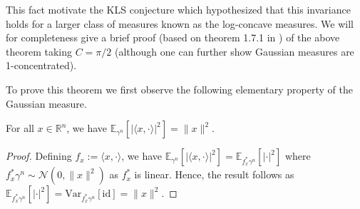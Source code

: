 This fact motivate the KLS conjecture which hypothesized that 
this invariance holds for a larger class of measures known as the log-concave measures. We will 
for completeness give a brief proof (based on theorem 1.7.1 in \cite{Bogachev_1998}) of the above theorem taking \(C = \pi / 2\) 
(although one can further show Gaussian measures are 1-concentrated).

To prove this theorem we first observe the following elementary property of the Gaussian measure.

\begin{lemma}\label{lem:gaussian_inner}
  For all \(x \in \mathbb{R}^n\), we have 
  \(\mathbb{E}_{\gamma^n}[|\langle x, \cdot \rangle|^2] = \|x\|^2\).
\end{lemma}
\begin{proof}
  Defining \(f_x := \langle x, \cdot \rangle\), we have 
  \(\mathbb{E}_{\gamma^n}[|\langle x, \cdot \rangle|^2] = \mathbb{E}_{f_x^* \gamma^n}[|\cdot |^2]\) where 
  \(f_x^* \gamma^n \sim \mathcal{N}(0, \|x\|^2)\) as \(f_x^*\) is linear. Hence, the result follows as 
  \(\mathbb{E}_{f_x^* \gamma^n}[|\cdot |^2] = \text{Var}_{f_x^* \gamma^n}[\text{id}] = \|x\|^2\).
\end{proof}

